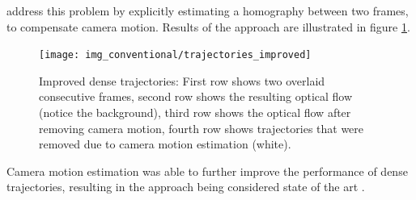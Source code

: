 \textcite{wang_action_2013} address this problem by explicitly estimating a homography between two frames, to compensate camera motion. 
Results of the approach are illustrated in figure \ref{fig:trajectories_improved}.

\begin{figure}[H]
    \centering
    \texttt{[image: img\_conventional/trajectories\_improved]}
    \caption{Improved dense trajectories: First row shows two overlaid consecutive frames, second row shows the resulting optical flow (notice the background), third row shows the optical flow after removing camera motion, fourth row shows trajectories that were removed due to camera motion estimation (white). \cite{wang_action_2013}}
    \label{fig:trajectories_improved}
\end{figure}

Camera motion estimation was able to further improve the performance of dense trajectories, resulting in the approach being considered state of the art \cite{tran_learning_2015}.
